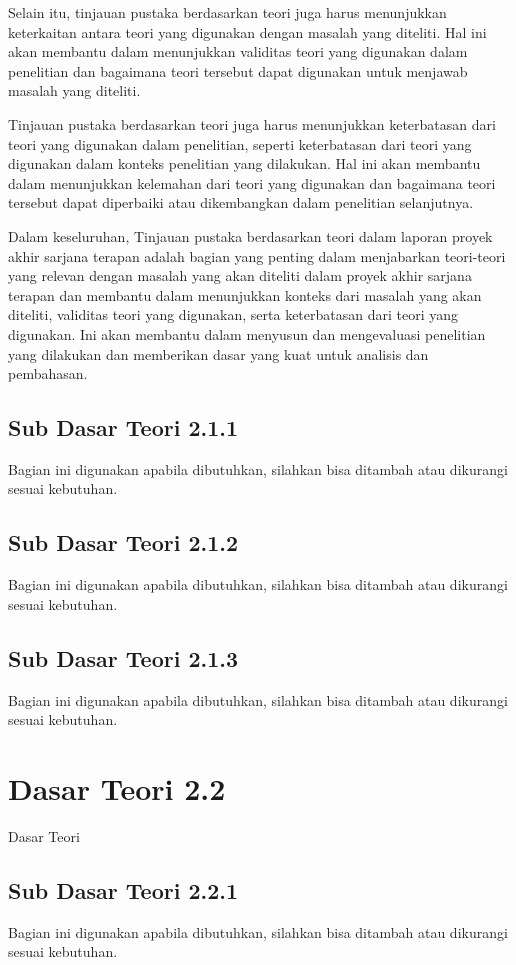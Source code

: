 Selain itu, tinjauan pustaka berdasarkan teori juga harus menunjukkan keterkaitan antara teori yang digunakan dengan masalah yang diteliti. Hal ini akan membantu dalam menunjukkan validitas teori yang digunakan dalam penelitian dan bagaimana teori tersebut dapat digunakan untuk menjawab masalah yang diteliti.

Tinjauan pustaka berdasarkan teori juga harus menunjukkan keterbatasan dari teori yang digunakan dalam penelitian, seperti keterbatasan dari teori yang digunakan dalam konteks penelitian yang dilakukan. Hal ini akan membantu dalam menunjukkan kelemahan dari teori yang digunakan dan bagaimana teori tersebut dapat diperbaiki atau dikembangkan dalam penelitian selanjutnya.

Dalam keseluruhan, Tinjauan pustaka berdasarkan teori dalam laporan proyek akhir sarjana terapan adalah bagian yang penting dalam menjabarkan teori-teori yang relevan dengan masalah yang akan diteliti dalam proyek akhir sarjana terapan dan membantu dalam menunjukkan konteks dari masalah yang akan diteliti, validitas teori yang digunakan, serta keterbatasan dari teori yang digunakan. Ini akan membantu dalam menyusun dan mengevaluasi penelitian yang dilakukan dan memberikan dasar yang kuat untuk analisis dan pembahasan.

\subsection{Sub Dasar Teori 2.1.1}
Bagian ini digunakan apabila dibutuhkan, silahkan bisa ditambah atau dikurangi sesuai kebutuhan.

\subsection{Sub Dasar Teori 2.1.2}
Bagian ini digunakan apabila dibutuhkan, silahkan bisa ditambah atau dikurangi sesuai kebutuhan.

\subsection{Sub Dasar Teori 2.1.3}
Bagian ini digunakan apabila dibutuhkan, silahkan bisa ditambah atau dikurangi sesuai kebutuhan.

\section{Dasar Teori 2.2}
\noindent Dasar Teori

\subsection{Sub Dasar Teori 2.2.1}
Bagian ini digunakan apabila dibutuhkan, silahkan bisa ditambah atau dikurangi sesuai kebutuhan.

